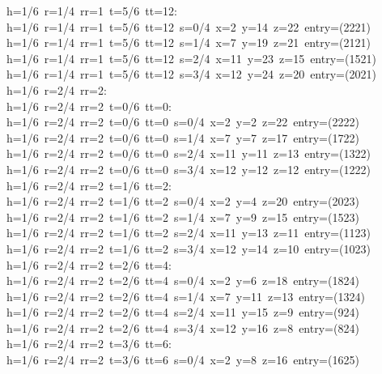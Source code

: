 \begin{tabbing}
h=1/6\ r=1/4\ rr=1\ t=5/6\ tt=12:\\[0pt]
h=1/6\ r=1/4\ rr=1\ t=5/6\ tt=12\ s=0/4\ x=2\ y=14\ z=22\ entry=(2221)\\[0pt]
h=1/6\ r=1/4\ rr=1\ t=5/6\ tt=12\ s=1/4\ x=7\ y=19\ z=21\ entry=(2121)\\[0pt]
h=1/6\ r=1/4\ rr=1\ t=5/6\ tt=12\ s=2/4\ x=11\ y=23\ z=15\ entry=(1521)\\[0pt]
h=1/6\ r=1/4\ rr=1\ t=5/6\ tt=12\ s=3/4\ x=12\ y=24\ z=20\ entry=(2021)\\[0pt]
h=1/6\ r=2/4\ rr=2:\\[0pt]
h=1/6\ r=2/4\ rr=2\ t=0/6\ tt=0:\\[0pt]
h=1/6\ r=2/4\ rr=2\ t=0/6\ tt=0\ s=0/4\ x=2\ y=2\ z=22\ entry=(2222)\\[0pt]
h=1/6\ r=2/4\ rr=2\ t=0/6\ tt=0\ s=1/4\ x=7\ y=7\ z=17\ entry=(1722)\\[0pt]
h=1/6\ r=2/4\ rr=2\ t=0/6\ tt=0\ s=2/4\ x=11\ y=11\ z=13\ entry=(1322)\\[0pt]
h=1/6\ r=2/4\ rr=2\ t=0/6\ tt=0\ s=3/4\ x=12\ y=12\ z=12\ entry=(1222)\\[0pt]
h=1/6\ r=2/4\ rr=2\ t=1/6\ tt=2:\\[0pt]
h=1/6\ r=2/4\ rr=2\ t=1/6\ tt=2\ s=0/4\ x=2\ y=4\ z=20\ entry=(2023)\\[0pt]
h=1/6\ r=2/4\ rr=2\ t=1/6\ tt=2\ s=1/4\ x=7\ y=9\ z=15\ entry=(1523)\\[0pt]
h=1/6\ r=2/4\ rr=2\ t=1/6\ tt=2\ s=2/4\ x=11\ y=13\ z=11\ entry=(1123)\\[0pt]
h=1/6\ r=2/4\ rr=2\ t=1/6\ tt=2\ s=3/4\ x=12\ y=14\ z=10\ entry=(1023)\\[0pt]
h=1/6\ r=2/4\ rr=2\ t=2/6\ tt=4:\\[0pt]
h=1/6\ r=2/4\ rr=2\ t=2/6\ tt=4\ s=0/4\ x=2\ y=6\ z=18\ entry=(1824)\\[0pt]
h=1/6\ r=2/4\ rr=2\ t=2/6\ tt=4\ s=1/4\ x=7\ y=11\ z=13\ entry=(1324)\\[0pt]
h=1/6\ r=2/4\ rr=2\ t=2/6\ tt=4\ s=2/4\ x=11\ y=15\ z=9\ entry=(924)\\[0pt]
h=1/6\ r=2/4\ rr=2\ t=2/6\ tt=4\ s=3/4\ x=12\ y=16\ z=8\ entry=(824)\\[0pt]
h=1/6\ r=2/4\ rr=2\ t=3/6\ tt=6:\\[0pt]
h=1/6\ r=2/4\ rr=2\ t=3/6\ tt=6\ s=0/4\ x=2\ y=8\ z=16\ entry=(1625)\\[0pt]

\end{tabbing}
